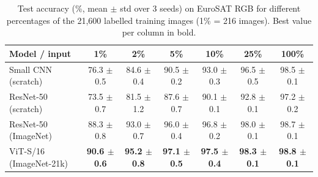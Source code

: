 \begin{table}[t]
\centering
\small
\setlength{\tabcolsep}{4pt}
\begin{tabular}{|l|c|c|c|c|c|c|}
\hline
Model / input & 1\% & 2\% & 5\% & 10\% & 25\% & 100\% \\ \hline \hline
Small CNN (scratch) & 76.3 $\pm$ 0.5 & 84.6 $\pm$ 0.4 & 90.5 $\pm$ 0.2 & 93.0 $\pm$ 0.3 & 96.5 $\pm$ 0.5 & 98.5 $\pm$ 0.1 \\
ResNet-50 (scratch) & 73.5 $\pm$ 0.7 & 81.5 $\pm$ 1.2 & 87.6 $\pm$ 0.7 & 90.1 $\pm$ 0.1 & 92.8 $\pm$ 0.1 & 97.2 $\pm$ 0.2 \\
ResNet-50 (ImageNet) & 88.3 $\pm$ 0.8 & 93.0 $\pm$ 0.7 & 96.0 $\pm$ 0.4 & 96.8 $\pm$ 0.2 & 98.0 $\pm$ 0.1 & 98.7 $\pm$ 0.1 \\
ViT-S/16 (ImageNet-21k) & \textbf{90.6 $\pm$ 0.6} & \textbf{95.2 $\pm$ 0.8} & \textbf{97.1 $\pm$ 0.5} & \textbf{97.5 $\pm$ 0.4} & \textbf{98.3 $\pm$ 0.1} & \textbf{98.8 $\pm$ 0.1} \\
\hline
\end{tabular}
\caption{Test accuracy (\%, mean $\pm$ std over 3 seeds) on EuroSAT RGB for different percentages of the 21,600 labelled training images (1\% = 216 images). Best value per column in bold.}
\label{tab:main}
\end{table}